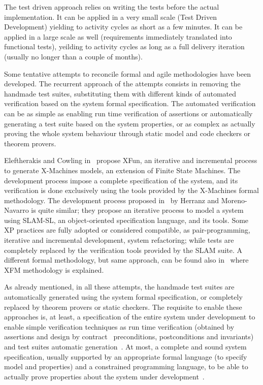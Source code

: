 \documentclass[english]{lni}
\begin{document}
The test driven approach relies on writing the tests before the actual implementation. 
It can be applied in a very small scale (Test Driven Development) yielding to activity cycles as short as a few minutes.
It can be applied in a large scale as well (requirements immediately translated into functional tests), yeilding to activity cycles as long as a full delivery iteration (usually no longer than a couple of months).

Some tentative attempts to reconcile formal and agile methodologies have been developed.
The recurrent approach of the attempts consists in removing the handmade test suites, substituting them with different kinds of automated verification based on the system formal specification. 
The automated verification can be as simple as enabling run time verification of assertions or automatically generating a test suite based on the system properties, or as complex as actually proving the whole system behaviour through static model and code checkers or theorem provers.

Eleftherakis and Cowling in~\cite{Eleftherakis2003} propose XFun, an iterative and incremental process to generate X-Machines models, an extension of Finite State Machines. 
The development process impose a complete specification of the system, and its verification is done exclusively using the tools provided by the X-Machines formal methodology. 
The development process proposed in~\cite{Herranz2003b} by Herranz and Moreno-Navarro is quite similar; they propose an iterative process to model a system using SLAM-SL, an object-oriented specification language, and its tools. 
Some XP practices are fully adopted or considered compatible, as pair-programming, iterative and incremental development, system refactoring; while tests are completely replaced by the verification tools provided by the SLAM suite.
A different formal methodology, but same approach, can be found also in~\cite{Suhaib2005} where XFM methodology is explained.

As already mentioned, in all these attempts, the handmade test suites are automatically generated using the system formal specification, or completely replaced by theorem provers or static checkers. 
The requisite to enable these approaches is, at least, a specification of the entire system under development to enable simple verification techniques as run time verification (obtained by assertions and design by contract~\cite{Meyer1997} preconditions, postconditions and invariants) and test suites automatic generation~\cite{Cheon2002,Cheon2004,Cheon2005}.
At most, a complete and sound system specification, usually supported by an appropriate formal language (to specify model and properties) and a constrained programming language, to be able to actually prove properties about the system under development~\cite{CatanoHuisman02,DetlefsNelsonSaxe2005,KiniryCok04}.
\end{document}
